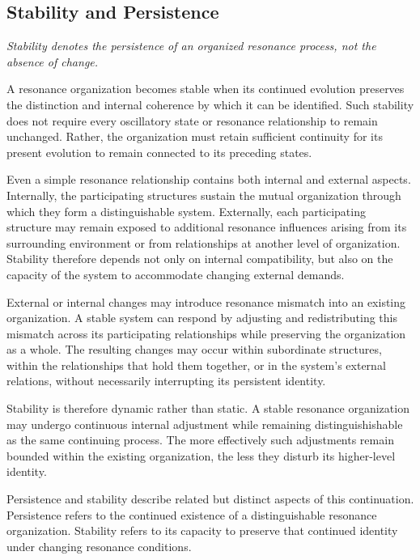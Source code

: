 \documentclass[11pt,a4paper]{article}
\begin{document}
\subsection{Stability and Persistence}

\emph{Stability denotes the persistence of an organized resonance process, not the absence of change.}
\vspace{0.6em} 

A resonance organization becomes stable when its continued evolution preserves the distinction and internal coherence by which it can be identified. Such stability does not require every oscillatory state or resonance relationship to remain unchanged. Rather, the organization must retain sufficient continuity for its present evolution to remain connected to its preceding states.

Even a simple resonance relationship contains both internal and external aspects. Internally, the participating structures sustain the mutual organization through which they form a distinguishable system. Externally, each participating structure may remain exposed to additional resonance influences arising from its surrounding environment or from relationships at another level of organization. Stability therefore depends not only on internal compatibility, but also on the capacity of the system to accommodate changing external demands.

External or internal changes may introduce resonance mismatch into an existing organization. A stable system can respond by adjusting and redistributing this mismatch across its participating relationships while preserving the organization as a whole. The resulting changes may occur within subordinate structures, within the relationships that hold them together, or in the system’s external relations, without necessarily interrupting its persistent identity.

Stability is therefore dynamic rather than static. A stable resonance organization may undergo continuous internal adjustment while remaining distinguishishable as the same continuing process. The more effectively such adjustments remain bounded within the existing organization, the less they disturb its higher-level identity.

Persistence and stability describe related but distinct aspects of this continuation. Persistence refers to the continued existence of a distinguishable resonance organization. Stability refers to its capacity to preserve that continued identity under changing resonance conditions.
\end{document}
